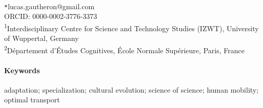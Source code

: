 \documentclass{article}
\newcommand*{\affaddr}[1]{#1}
\newcommand*{\affmark}[1][*]{\textsuperscript{#1}}
\newcommand*{\email}[1][*]{\texttt{#1}}
\begin{document}
\ \\

  \email{lucas.gautheron@gmail.com}\\ORCID: 0000-0002-3776-3373\\
 \affaddr{\affmark[1]Interdisciplinary Centre for Science and Technology Studies (IZWT), University of Wuppertal, Germany}\\
 \affaddr{\affmark[2]Département d'Études Cognitives, École Normale Supérieure, Paris, France}

 \paragraph{Keywords}{adaptation; specialization; cultural evolution; science of science; human mobility; optimal transport}
 
 \pagebreak








\end{document}
